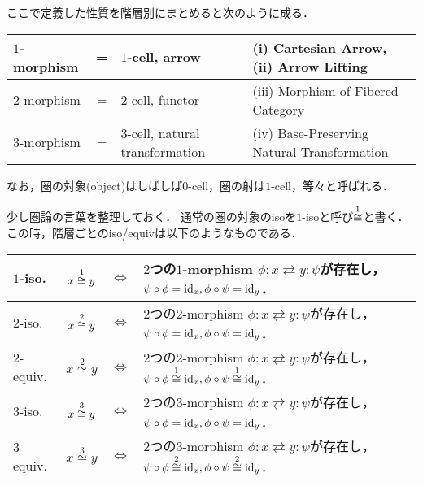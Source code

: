 \documentclass[a4paper, dvipdfmx]{jsarticle}
\newcommand{\kiso}[1][{}]{\overset{#1}{\iso}}
\newcommand{\kequiv}[1][{}]{\overset{#1}{\simeq}}
\begin{document}
\begin{Remark}
    ここで定義した性質を階層別にまとめると次のように成る．
    \begin{center}
    \begin{tabular}{lcl|l}
        \hline
        $1$-morphism &=& $1$-cell, arrow & (i) Cartesian Arrow, (ii) Arrow Lifting \\ \hline
        $2$-morphism &=& $2$-cell, functor & (iii) Morphism of Fibered Category \\ \hline
        $3$-morphism &=& $3$-cell, natural transformation & (iv) Base-Preserving Natural Transformation \\
        \hline
    \end{tabular}
    \end{center}
    なお，圏の対象(object)はしばしば$0$-cell，圏の射は$1$-cell，等々と呼ばれる．
\end{Remark}

\begin{Remark}
    少し圏論の言葉を整理しておく．
    通常の圏の対象のisoを$1$-isoと呼び$\kiso[1]$と書く．
    この時，階層ごとのiso/equivは以下のようなものである．
    \begin{center}
        \begin{tabular}{lccl}
            $1$-iso. & $x \kiso[1] y$& $\iff$ &
                $2$つの$1$-morphism $\phi \colon x \rightleftarrows y \colon \psi$が存在し， 
                $\psi \circ \phi=\id[x], \phi \circ \psi=\id[y]$．\\ \hline
            $2$-iso. & $x \kiso[2] y$& $\iff$ &
                $2$つの$2$-morphism $\phi \colon x \rightleftarrows y \colon \psi$が存在し， 
                $\psi \circ \phi=\id[x], \phi \circ \psi=\id[y]$．\\
            $2$-equiv. & $x \kequiv[2] y$& $\iff$ &
                $2$つの$2$-morphism $\phi \colon x \rightleftarrows y \colon \psi$が存在し， 
                $\psi \circ \phi \kiso[1] \id[x], \phi \circ \psi \kiso[1] \id[y]$．\\ \hline
            $3$-iso. & $x \kiso[3] y$& $\iff$ &
                $2$つの$3$-morphism $\phi \colon x \rightleftarrows y \colon \psi$が存在し， 
                $\psi \circ \phi=\id[x], \phi \circ \psi=\id[y]$．\\
            $3$-equiv. & $x \kequiv[3] y$& $\iff$ &
                $2$つの$3$-morphism $\phi \colon x \rightleftarrows y \colon \psi$が存在し， 
                $\psi \circ \phi \kiso[2] \id[x], \phi \circ \psi \kiso[2] \id[y]$．\\
        \end{tabular}
    \end{center}
\end{Remark}
\end{document}
